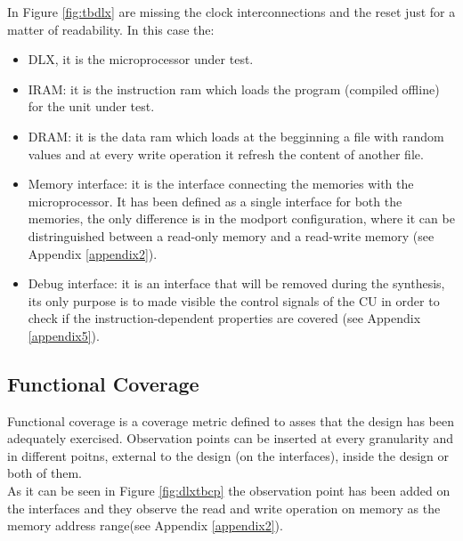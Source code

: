 In Figure \ref{fig:tbdlx} are missing the clock interconnections and the reset just for a matter of readability. In this case the:
\begin{itemize}
\item DLX, it is the microprocessor under test.
\item IRAM: it is the instruction ram which loads the program (compiled offline) for the unit under test.
\item DRAM: it is the data ram which loads at the begginning a file with random values and at every write operation it refresh the content of another file. 
\item Memory interface: it is the interface connecting the memories with the microprocessor. It has been defined as a single interface for both the memories, the only difference is in the modport configuration, where it can be distringuished between a read-only memory and a read-write memory (see Appendix \ref{appendix2}).
\item Debug interface: it is an interface that will be removed during the synthesis, its only purpose is to made visible the control signals of the CU in order to check if the instruction-dependent properties are covered (see Appendix \ref{appendix5}).
\end{itemize}


\subsection{Functional Coverage}
Functional coverage is a coverage metric defined to asses that the design has been adequately exercised\cite{paper:2}.
Observation points can be inserted at every granularity and in different poitns, external to the design (on the interfaces), inside the design or both of them.\\
As it can be seen in Figure \ref{fig:dlxtbcp} the observation point has been added on the interfaces and they observe the read and write operation on memory as the memory address range(see Appendix \ref{appendix2}).


